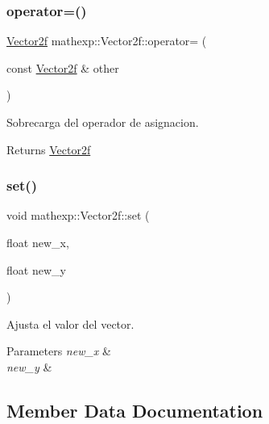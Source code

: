 \subsubsection{\texorpdfstring{operator=()}{operator=()}}
{\footnotesize\ttfamily \mbox{\hyperlink{structmathexp_1_1_vector2f}{Vector2f}} mathexp\+::\+Vector2f\+::operator= (\begin{DoxyParamCaption}\item[{const \mbox{\hyperlink{structmathexp_1_1_vector2f}{Vector2f}} \&}]{other }\end{DoxyParamCaption})}



Sobrecarga del operador de asignacion. 

\begin{DoxyReturn}{Returns}
\mbox{\hyperlink{structmathexp_1_1_vector2f}{Vector2f}} 
\end{DoxyReturn}
\mbox{\label{structmathexp_1_1_vector2f_a5d1771f3355882d88cc7cd100b9d76f1}} 
\subsubsection{\texorpdfstring{set()}{set()}}
{\footnotesize\ttfamily void mathexp\+::\+Vector2f\+::set (\begin{DoxyParamCaption}\item[{float}]{new\+\_\+x,  }\item[{float}]{new\+\_\+y }\end{DoxyParamCaption})}



Ajusta el valor del vector. 


\begin{DoxyParams}{Parameters}
{\em new\+\_\+x} & \\
\hline
{\em new\+\_\+y} & \\
\hline
\end{DoxyParams}


\subsection{Member Data Documentation}
\mbox{\label{structmathexp_1_1_vector2f_a23439427fa69b2e7cd68101c960ccffd}} 

